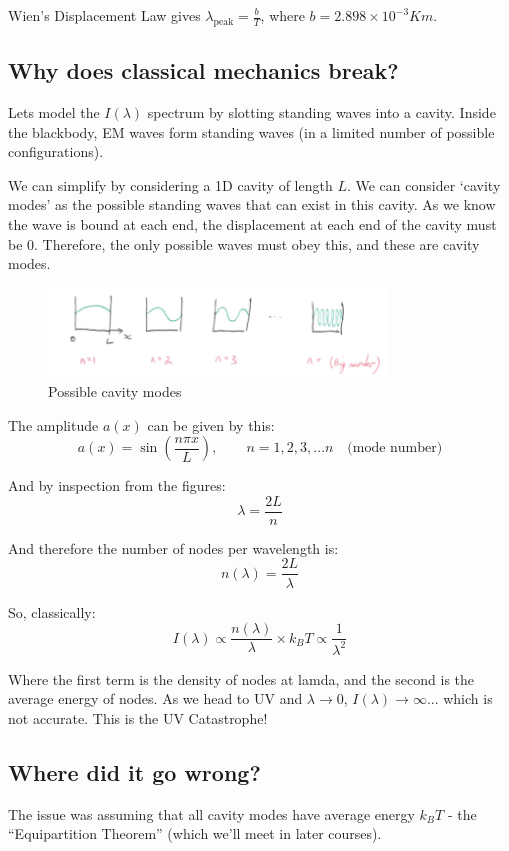 Wien's Displacement Law gives $\lambda_{\text{peak}} = \frac{b}{T}$, where $b = 2.898 \times 10^{-3} Km$.

\subsection*{Why does classical mechanics break?}

Lets model the $I(\lambda)$ spectrum by slotting standing waves into a cavity. Inside the blackbody, EM waves form standing waves (in a limited number of possible configurations).

We can simplify by considering a 1D cavity of length $L$. We can consider `cavity modes' as the possible standing waves that can exist in this cavity. As we know the wave is bound at each end, the displacement at each end of the cavity must be $0$. Therefore, the only possible waves must obey this, and these are cavity modes.

\begin{figure}[H]
    \centering
    \includegraphics[width=0.8\textwidth]{figures/lec02-03.png}
     \caption{Possible cavity modes}
\end{figure}

The amplitude $a(x)$ can be given by this:
\[
    a(x) = \sin \left(\frac{n \pi x}{L}\right), \qquad n = 1, 2, 3, \ldots n \quad \text{(mode number)}
\]

And by inspection from the figures:
\[
    \lambda = \frac{2L}{n}
\]

And therefore the number of nodes per wavelength is:
\[
    n(\lambda) = \frac{2L}{\lambda}
\]

So, classically:
\[
    I(\lambda) \propto \frac{n(\lambda)}{\lambda} \times k_B T \propto \frac{1}{\lambda^2}
\]

Where the first term is the density of nodes at lamda, and the second is the average energy of nodes. As we head to UV and $\lambda \to 0$, $I(\lambda) \to \infty$... which is not accurate. This is the UV Catastrophe!


\subsection*{Where did it go wrong?}
The issue was assuming that all cavity modes have average energy $k_B T$ - the ``Equipartition Theorem'' (which we'll meet in later courses).

